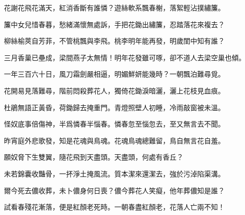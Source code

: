 \begin{poem}
    \begin{pl} 花謝花飛花滿天，紅消香斷有誰憐？遊絲軟系飄春榭，落絮輕沾撲繡簾。\end{pl}

    \begin{pl} 簾中女兒惜春暮，愁緒滿懷無處訴，手把花鋤出繡簾，忍踏落花來複去？\end{pl}

    \begin{pl} 柳絲榆莢自芳菲，不管桃飄與李飛。桃李明年能再發，明歲閨中知有誰？\end{pl}

    \begin{pl} 三月香巢已壘成，梁間燕子太無情！明年花發雖可啄，卻不道人去梁空巢也傾。\end{pl}

    \begin{pl} 一年三百六十日，風刀霜劍嚴相逼，明媚鮮妍能幾時？一朝飄泊難尋覓。\end{pl}

    \begin{pl} 花開易見落難尋，階前悶殺葬花人，獨倚花鋤淚暗灑，灑上花枝見血痕。\end{pl}

    \begin{pl} 杜鵑無語正黃昏，荷鋤歸去掩重門。青燈照壁人初睡，冷雨敲窗被未溫。\end{pl}

    \begin{pl} 怪奴底事倍傷神，半爲憐春半惱春。憐春忽至惱忽去，至又無言去不聞。\end{pl}

    \begin{pl} 昨宵庭外悲歌發，知是花魂與鳥魂。花魂鳥魂總難留，鳥自無言花自羞。\end{pl}

    \begin{pl} 願奴脅下生雙翼，隨花飛到天盡頭。天盡頭，何處有香丘？\end{pl}

    \begin{pl} 未若錦囊收豔骨，一抔淨土掩風流。質本潔來還潔去，強於污淖陷渠溝。\end{pl}

    \begin{pl} 爾今死去儂收葬，未卜儂身何日喪？儂今葬花人笑癡，他年葬儂知是誰？\end{pl}

    \begin{pl} 試看春殘花漸落，便是紅顏老死時。一朝春盡紅顏老，花落人亡兩不知！\end{pl}
\end{poem}


